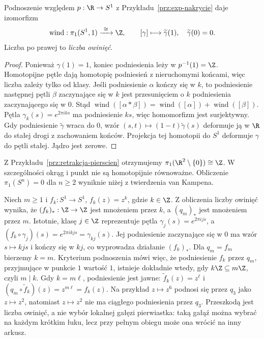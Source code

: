 \begin{twierdzenie}
\label{thm:pi1-okragu}
Podnoszenie względem $p:\R\to S^1$
z Przykładu~\ref{prz:exp-nakrycie} daje
izomorfizm
\[
 \operatorname{wind}:\pi_1(S^1,1)\xrightarrow{\ \cong\ }\Z,
 \qquad [\gamma]\longmapsto
 \widetilde\gamma(1),
 \quad \widetilde\gamma(0)=0.
\]
Liczba po prawej to \emph{liczba owinięć}.
\end{twierdzenie}
\begin{proof}
Ponieważ $\gamma(1)=1$, koniec
podniesienia leży w $p^{-1}(1)=\Z$.
Homotopijne pętle dają homotopię
podniesień z nieruchomymi końcami,
więc liczba zależy tylko od klasy.
Jeśli podniesienie $\alpha$ kończy się w $k$,
to podniesienie następnej pętli $\beta$
zaczynające się w $k$ jest przesunięciem
o $k$ podniesienia zaczynającego się w $0$.
Stąd $\operatorname{wind}([\alpha*\beta])
=\operatorname{wind}([\alpha])
+\operatorname{wind}([\beta])$.
Pętla $\gamma_k(s)=e^{2\pi i ks}$
ma podniesienie $ks$, więc homomorfizm
jest surjektywny. Gdy podniesienie
$\widetilde\gamma$ wraca do $0$,
wzór $(s,t)\mapsto(1-t)\widetilde\gamma(s)$
deformuje ją w $\R$ do stałej drogi
z zachowaniem końców. Projekcja tej
homotopii do $S^1$ deformuje $\gamma$
do pętli stałej. Jądro jest zerowe.
\end{proof}

Z Przykładu~\ref{prz:retrakcja-pierscien}
otrzymujemy $\pi_1(\R^2\setminus\{0\})\cong\Z$.
W szczególności okrąg i punkt nie są
homotopijnie równoważne. Obliczenie
$\pi_1(S^{n})=0$ dla $n\geq2$
wyniknie niżej z twierdzenia van Kampena.

\begin{przyklad}
\label{prz:podnoszenie-poteg}
Niech $m\geq1$ i $f_k:S^1\to S^1$, $f_k(z)=z^k$,
gdzie $k\in\Z$. Z obliczenia liczby owinięć wynika, że
$(f_k)_*:\Z\to\Z$ jest mnożeniem przez $k$, a
$(q_m)_*$ jest mnożeniem przez $m$.
Istotnie, klasę $j\in\Z$ reprezentuje pętla
$\gamma_j(s)=e^{2\pi ijs}$, a
$(f_k\circ\gamma_j)(s)=e^{2\pi ikjs}=\gamma_{kj}(s)$.
Jej podniesienie zaczynające się w $0$ ma wzór $s\mapsto kjs$
i kończy się w $kj$, co wyprowadza działanie $(f_k)_*$.
Dla $q_m=f_m$ bierzemy $k=m$. Kryterium
podnoszenia mówi więc, że podniesienie $f_k$ przez
$q_m$, przyjmujące w punkcie $1$ wartość $1$, istnieje
dokładnie wtedy, gdy $k\Z\subseteq m\Z$, czyli $m\mid k$.
Gdy $k=m\ell$, podniesienie jest jawne:
$\widetilde f_k(z)=z^\ell$ i
$(q_m\circ\widetilde f_k)(z)=z^{m\ell}=f_k(z)$.
Na przykład $z\mapsto z^6$ podnosi się przez $q_3$
jako $z\mapsto z^2$, natomiast $z\mapsto z^2$
nie ma ciągłego podniesienia przez $q_3$.
Przeszkodą jest liczba owinięć, a nie wybór lokalnej
gałęzi pierwiastka: taką gałąź można wybrać na każdym
krótkim łuku, lecz przy pełnym obiegu może ona wrócić
na inny arkusz.
\end{przyklad}

